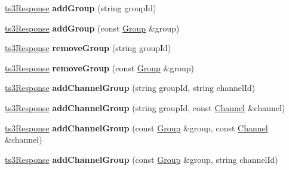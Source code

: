 \begin{DoxyCompactItemize}
\item 
\hyperlink{struct_ts3_api_1_1ts3_response}{ts3\+Response} {\bfseries add\+Group} (string group\+Id)\hypertarget{class_ts3_api_1_1_client_aa750751c286e1455c1d19c939efd4c0b}{}\label{class_ts3_api_1_1_client_aa750751c286e1455c1d19c939efd4c0b}

\item 
\hyperlink{struct_ts3_api_1_1ts3_response}{ts3\+Response} {\bfseries add\+Group} (const \hyperlink{class_ts3_api_1_1_group}{Group} \&group)\hypertarget{class_ts3_api_1_1_client_a35a6a7ad28623a19bdbb186f871a670c}{}\label{class_ts3_api_1_1_client_a35a6a7ad28623a19bdbb186f871a670c}

\item 
\hyperlink{struct_ts3_api_1_1ts3_response}{ts3\+Response} {\bfseries remove\+Group} (string group\+Id)\hypertarget{class_ts3_api_1_1_client_a8e204f17ea4fc85f7f7c0ffb2da656c2}{}\label{class_ts3_api_1_1_client_a8e204f17ea4fc85f7f7c0ffb2da656c2}

\item 
\hyperlink{struct_ts3_api_1_1ts3_response}{ts3\+Response} {\bfseries remove\+Group} (const \hyperlink{class_ts3_api_1_1_group}{Group} \&group)\hypertarget{class_ts3_api_1_1_client_a7bce985b603efcf0ff8962fcab3a5561}{}\label{class_ts3_api_1_1_client_a7bce985b603efcf0ff8962fcab3a5561}

\item 
\hyperlink{struct_ts3_api_1_1ts3_response}{ts3\+Response} {\bfseries add\+Channel\+Group} (string group\+Id, string channel\+Id)\hypertarget{class_ts3_api_1_1_client_ac98aa52e4c9a76e65f5786ce8197c712}{}\label{class_ts3_api_1_1_client_ac98aa52e4c9a76e65f5786ce8197c712}

\item 
\hyperlink{struct_ts3_api_1_1ts3_response}{ts3\+Response} {\bfseries add\+Channel\+Group} (string group\+Id, const \hyperlink{class_ts3_api_1_1_channel}{Channel} \&channel)\hypertarget{class_ts3_api_1_1_client_aa50ad14f4af3336dc852dd7d836db88f}{}\label{class_ts3_api_1_1_client_aa50ad14f4af3336dc852dd7d836db88f}

\item 
\hyperlink{struct_ts3_api_1_1ts3_response}{ts3\+Response} {\bfseries add\+Channel\+Group} (const \hyperlink{class_ts3_api_1_1_group}{Group} \&group, const \hyperlink{class_ts3_api_1_1_channel}{Channel} \&channel)\hypertarget{class_ts3_api_1_1_client_a4ebbfa0837f4c5d70d40fda76042178d}{}\label{class_ts3_api_1_1_client_a4ebbfa0837f4c5d70d40fda76042178d}

\item 
\hyperlink{struct_ts3_api_1_1ts3_response}{ts3\+Response} {\bfseries add\+Channel\+Group} (const \hyperlink{class_ts3_api_1_1_group}{Group} \&group, string channel\+Id)\hypertarget{class_ts3_api_1_1_client_ae504b68d7d3e8fe32b568e54868392b5}{}\label{class_ts3_api_1_1_client_ae504b68d7d3e8fe32b568e54868392b5}


\end{DoxyCompactItemize}
